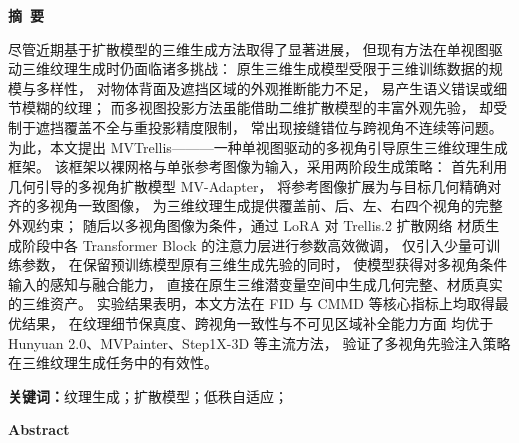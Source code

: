 \cleardoublepage{}
\begin{center}
    \bfseries {} 摘~要
\end{center}

尽管近期基于扩散模型的三维生成方法取得了显著进展，
但现有方法在单视图驱动三维纹理生成时仍面临诸多挑战：
原生三维生成模型受限于三维训练数据的规模与多样性，
对物体背面及遮挡区域的外观推断能力不足，
易产生语义错误或细节模糊的纹理；
而多视图投影方法虽能借助二维扩散模型的丰富外观先验，
却受制于遮挡覆盖不全与重投影精度限制，
常出现接缝错位与跨视角不连续等问题。
为此，本文提出 MVTrellis———一种单视图驱动的多视角引导原生三维纹理生成框架。
该框架以裸网格与单张参考图像为输入，采用两阶段生成策略：
首先利用几何引导的多视角扩散模型 MV-Adapter，
将参考图像扩展为与目标几何精确对齐的多视角一致图像，
为三维纹理生成提供覆盖前、后、左、右四个视角的完整外观约束；
随后以多视角图像为条件，通过 LoRA 对 Trellis.2 扩散网络
材质生成阶段中各 Transformer Block 的注意力层进行参数高效微调，
仅引入少量可训练参数，
在保留预训练模型原有三维生成先验的同时，
使模型获得对多视角条件输入的感知与融合能力，
直接在原生三维潜变量空间中生成几何完整、材质真实的三维资产。
实验结果表明，本文方法在 FID 与 CMMD 等核心指标上均取得最优结果，
在纹理细节保真度、跨视角一致性与不可见区域补全能力方面
均优于 Hunyuan 2.0、MVPainter、Step1X-3D 等主流方法，
验证了多视角先验注入策略在三维纹理生成任务中的有效性。

\vspace{0.7em}

\noindent\textbf{关键词：}纹理生成；扩散模型；低秩自适应；


\cleardoublepage{}
\begin{center}
    \bfseries {} Abstract
\end{center}

